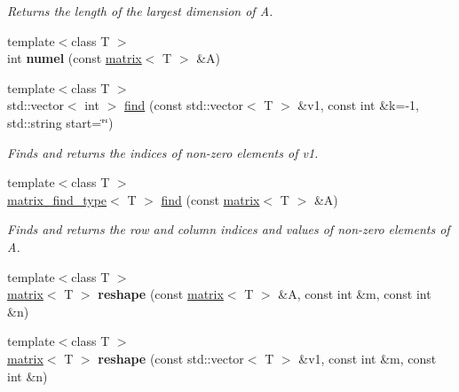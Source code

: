\begin{DoxyCompactItemize}
\begin{DoxyCompactList}\small\item\em Returns the length of the largest dimension of A. \end{DoxyCompactList}\item 
\hypertarget{namespacekeycpp_abd52330177821fc7cbf3f1c29e49f476}{{\footnotesize template$<$class T $>$ }\\int {\bfseries numel} (const \hyperlink{classkeycpp_1_1matrix}{matrix}$<$ T $>$ \&A)}\label{namespacekeycpp_abd52330177821fc7cbf3f1c29e49f476}

\item 
\hypertarget{namespacekeycpp_ae34a4afffae90a5579e08be7d2177b2c}{{\footnotesize template$<$class T $>$ }\\std\-::vector$<$ int $>$ \hyperlink{namespacekeycpp_ae34a4afffae90a5579e08be7d2177b2c}{find} (const std\-::vector$<$ T $>$ \&v1, const int \&k=-\/1, std\-::string start=\char`\"{}\char`\"{})}\label{namespacekeycpp_ae34a4afffae90a5579e08be7d2177b2c}

\begin{DoxyCompactList}\small\item\em Finds and returns the indices of non-\/zero elements of v1. \end{DoxyCompactList}\item 
\hypertarget{namespacekeycpp_a97f0fc27cf8489f3f556fb1a0c975115}{{\footnotesize template$<$class T $>$ }\\\hyperlink{structkeycpp_1_1matrix__find__type}{matrix\-\_\-find\-\_\-type}$<$ T $>$ \hyperlink{namespacekeycpp_a97f0fc27cf8489f3f556fb1a0c975115}{find} (const \hyperlink{classkeycpp_1_1matrix}{matrix}$<$ T $>$ \&A)}\label{namespacekeycpp_a97f0fc27cf8489f3f556fb1a0c975115}

\begin{DoxyCompactList}\small\item\em Finds and returns the row and column indices and values of non-\/zero elements of A. \end{DoxyCompactList}\item 
\hypertarget{namespacekeycpp_a5ef6aab5ede3802c66f27415107594ed}{{\footnotesize template$<$class T $>$ }\\\hyperlink{classkeycpp_1_1matrix}{matrix}$<$ T $>$ {\bfseries reshape} (const \hyperlink{classkeycpp_1_1matrix}{matrix}$<$ T $>$ \&A, const int \&m, const int \&n)}\label{namespacekeycpp_a5ef6aab5ede3802c66f27415107594ed}

\item 
\hypertarget{namespacekeycpp_a5a32dc59a247e09814a4b8ce9ea1db57}{{\footnotesize template$<$class T $>$ }\\\hyperlink{classkeycpp_1_1matrix}{matrix}$<$ T $>$ {\bfseries reshape} (const std\-::vector$<$ T $>$ \&v1, const int \&m, const int \&n)}\label{namespacekeycpp_a5a32dc59a247e09814a4b8ce9ea1db57}


\end{DoxyCompactItemize}
